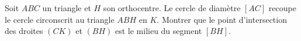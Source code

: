\documentclass[varwidth]{standalone}
\begin{document}
    Soit $ABC$ un triangle et $H$ son orthocentre. Le cercle de diam\`etre $[AC]$ recoupe le cercle circonscrit au triangle $ABH$ en $K$. Montrer que le point d'intersection des droites $(CK)$ et $(BH)$ est le milieu du segment $[BH]$.
\end{document}
